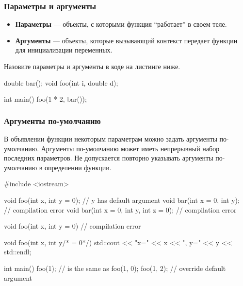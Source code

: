 \documentclass[compress, 8pt, aspectratio=169]{beamer}
\begin{document}
\begin{frame}[fragile]

    \frametitle{Параметры и аргументы}

    \begin{itemize}

        \item \textbf{Параметры} --- объекты, с которыми функция \enquote{работает} в своем теле.

        \item \textbf{Аргументы} --- объекты, которые вызывающий контекст передает функции
            для инициализации переменных.

    \end{itemize}

    \hfill\break
    \begin{task}
        Назовите параметры и аргументы в коде на листинге ниже.
    \end{task}

    \begin{myinplacelisting}[minted language=cpp]
double bar();
void foo(int i, double d);

int main() {
    foo(1 * 2, bar());
}
    \end{myinplacelisting}

\end{frame}

\begin{frame}[fragile]

    \frametitle{Аргументы по-умолчанию}

    \hfill\break
    В объявлении функции некоторым параметрам можно задать аргументы по-умолчанию.
    Аргументы по-умолчанию может иметь непрерывный набор последних параметров.
    Не допускается повторно указывать аргументы по-умолчанию в определении функции.

    \begin{myinplacelisting}[minted language=cpp]
#include <iostream>

void foo(int x, int y = 0); // y has default argument
void bar(int x = 0, int y); // compilation error
void bar(int x = 0, int y, int z = 0); // compilation error

void foo(int x, int y = 0) {} // compilation error

void foo(int x, int y/* = 0*/) {
    std::cout << "x=" << x << ", y=" << y << std::endl;
}

int main() {
    foo(1); // is the same as foo(1, 0);
    foo(1, 2); // override default argument
}
    \end{myinplacelisting}

\end{frame}
\end{document}

